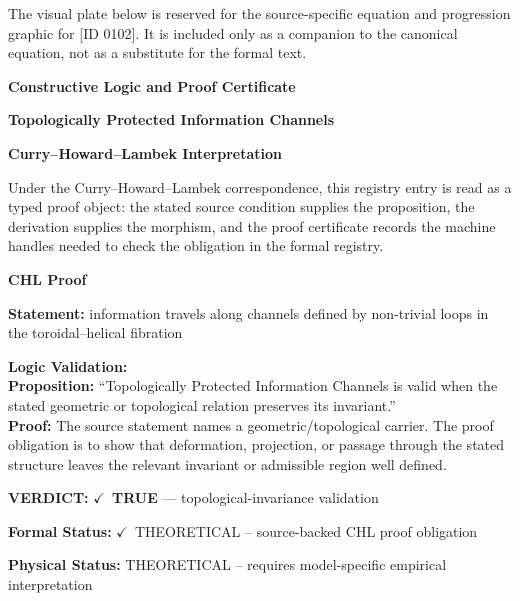\begingroup\footnotesize\sloppy
The visual plate below is reserved for the source-specific equation and progression graphic for [ID 0102]. It is included only as a companion to the canonical equation, not as a substitute for the formal text.
\par\endgroup
\ifTZPDarkEdition
{}
\fi

\clearpage
\begingroup\tzpsupportsetup
\noindent\textbf{\fontsize{10.8pt}{12.8pt}\selectfont [ID 0102] Constructive Logic and Proof Certificate}\par
\noindent\textbf{\fontsize{10pt}{12pt}\selectfont Topologically Protected Information Channels}\par
\vspace{0.45em}
\begingroup
\footnotesize
\setlength{\parskip}{0.22em}
\setlength{\parindent}{0pt}
\noindent\textbf{Curry--Howard--Lambek Interpretation}\par
Under the Curry--Howard--Lambek correspondence, this registry entry is read as a typed proof
object: the stated source condition supplies the proposition, the derivation supplies the
morphism, and the proof certificate records the machine handles needed to check the obligation
in the formal registry.

\vspace{0.45em}
\noindent\textbf{CHL Proof}\par
\textbf{Statement:} information travels along channels defined by non-trivial loops in the toroidal--helical
fibration

\textbf{Logic Validation:}\\
\textbf{Proposition:} ``Topologically Protected Information Channels is valid when the stated geometric or
topological relation preserves its invariant.''\\
\textbf{Proof:} The source statement names a geometric/topological carrier. The proof obligation is to
show that deformation, projection, or passage through the stated structure leaves the
relevant invariant or admissible region well defined.

\textbf{VERDICT:} \ensuremath{\checkmark}\ \textbf{TRUE} --- topological-invariance validation

\textbf{Formal Status:} \ensuremath{\checkmark}\ THEORETICAL -- source-backed CHL proof obligation

\textbf{Physical Status:} THEORETICAL -- requires model-specific empirical interpretation
\par\vspace{0.45em}
\par
\ifTZPDarkEdition
{}
\fi
\endgroup
\endgroup
